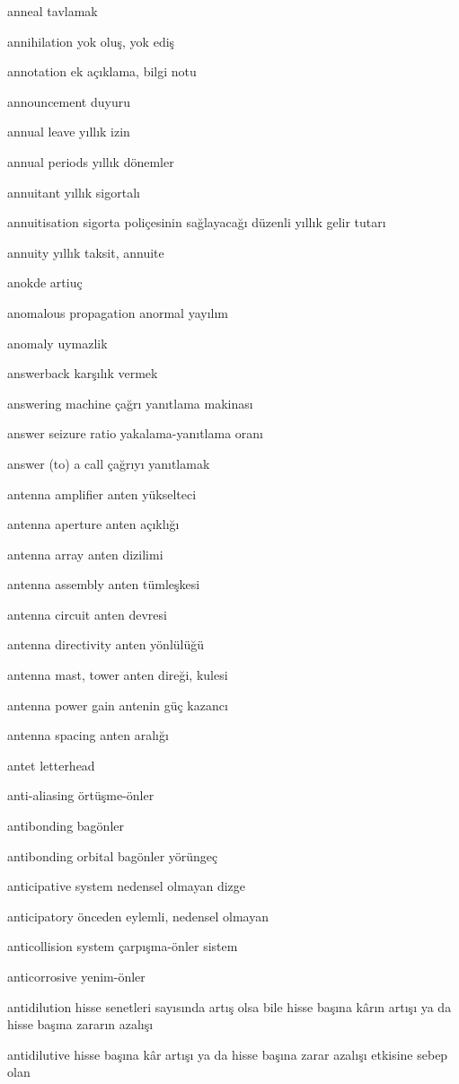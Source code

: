\documentclass[12pt,fleqn]{article}\usepackage{../../common}
\begin{document}
anneal tavlamak

annihilation yok oluş, yok ediş

annotation ek açıklama, bilgi notu

announcement duyuru

annual leave yıllık izin

annual periods yıllık dönemler

annuitant yıllık sigortalı

annuitisation sigorta poliçesinin sağlayacağı düzenli yıllık gelir tutarı

annuity yıllık taksit, annuite

anokde artiuç

anomalous propagation anormal yayılım

anomaly uymazlik

answerback karşılık vermek

answering machine çağrı yanıtlama makinası

answer seizure ratio yakalama-yanıtlama oranı

answer (to) a call çağrıyı yanıtlamak

antenna amplifier anten yükselteci

antenna aperture anten açıklığı

antenna array anten dizilimi

antenna assembly anten tümleşkesi

antenna circuit anten devresi

antenna directivity anten yönlülüğü

antenna mast, tower anten direği, kulesi

antenna power gain antenin güç kazancı

antenna spacing anten aralığı

antet letterhead

anti-aliasing örtüşme-önler

antibonding bagönler

antibonding orbital bagönler yörüngeç

anticipative system nedensel olmayan dizge

anticipatory önceden eylemli, nedensel olmayan

anticollision system çarpışma-önler sistem

anticorrosive yenim-önler

antidilution hisse senetleri sayısında artış olsa bile hisse başına kârın artışı ya da hisse başına zararın azalışı

antidilutive hisse başına kâr artışı ya da hisse başına zarar azalışı etkisine sebep olan
\end{document}

